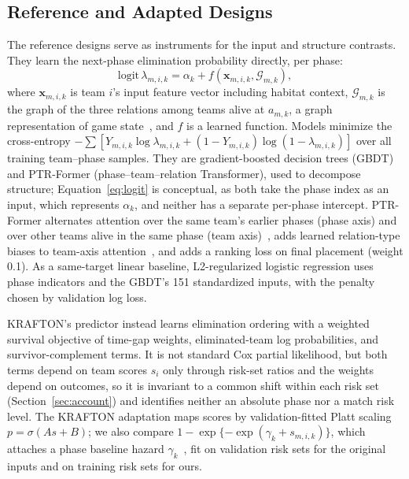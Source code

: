 \documentclass[sigconf,anonymous]{acmart}
\begin{document}
\subsection{Reference and Adapted Designs}
\label{sec:method:rq2}
The reference designs serve as instruments for the input and structure contrasts. They learn the next-phase elimination probability directly, per phase:
\begin{equation}
\mathrm{logit}\,\lambda_{m,i,k}=\alpha_k+f(\mathbf{x}_{m,i,k},\mathcal{G}_{m,k}),
\label{eq:logit}
\end{equation}
where $\mathbf{x}_{m,i,k}$ is team $i$'s input feature vector including habitat context, $\mathcal{G}_{m,k}$ is the graph of the three relations among teams alive at $a_{m,k}$, a graph representation of game state~\cite{Xenopoulos21}, and $f$ is a learned function.
Models minimize the cross-entropy $-\sum[Y_{m,i,k}\log\lambda_{m,i,k}+(1-Y_{m,i,k})\log(1-\lambda_{m,i,k})]$ over all training team--phase samples.
They are gradient-boosted decision trees (GBDT)~\cite{Friedman01} and PTR-Former (phase--team--relation Transformer), used to decompose structure; Equation~\eqref{eq:logit} is conceptual, as both take the phase index as an input, which represents $\alpha_k$, and neither has a separate per-phase intercept.
PTR-Former alternates attention over the same team's earlier phases (phase axis) and over other teams alive in the same phase (team axis)~\cite{Vaswani17,Ngiam22}, adds learned relation-type biases to team-axis attention~\cite{Ying21}, and adds a ranking loss on final placement (weight 0.1). As a same-target linear baseline, L2-regularized logistic regression uses phase indicators and the GBDT's 151 standardized inputs, with the penalty chosen by validation log loss.

KRAFTON's predictor instead learns elimination ordering with a weighted survival objective of time-gap weights, eliminated-team log probabilities, and survivor-complement terms. It is not standard Cox partial likelihood, but both terms depend on team scores $s_i$ only through risk-set ratios and the weights depend on outcomes, so it is invariant to a common shift within each risk set (Section~\ref{sec:account}) and identifies neither an absolute phase nor a match risk level. The KRAFTON adaptation maps scores by validation-fitted Platt scaling $p=\sigma(A s+B)$; we also compare $1-\exp\{-\exp(\gamma_k+s_{m,i,k})\}$, which attaches a phase baseline hazard $\gamma_k$~\cite{PrenticeGloeckler78}, fit on validation risk sets for the original inputs and on training risk sets for ours.
\end{document}
